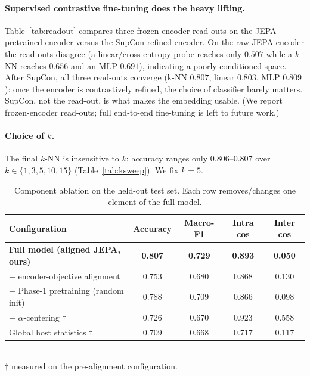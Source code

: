 \documentclass{article}
\begin{document}
\paragraph{Supervised contrastive fine-tuning does the heavy lifting.} Table~\ref{tab:readout} compares three frozen-encoder read-outs on the JEPA-pretrained encoder versus the SupCon-refined encoder. On the raw JEPA encoder the read-outs disagree (a linear/cross-entropy probe reaches only $0.507$ while a $k$-NN reaches $0.656$ and an MLP $0.691$), indicating a poorly conditioned space. After SupCon, all three read-outs converge (k-NN $0.807$, linear $0.803$, MLP $0.809$): once the encoder is contrastively refined, the choice of classifier barely matters. SupCon, not the read-out, is what makes the embedding usable. (We report frozen-encoder read-outs; full end-to-end fine-tuning is left to future work.)

\paragraph{Choice of $k$.} The final $k$-NN is insensitive to $k$: accuracy ranges only $0.806$--$0.807$ over $k \in \{1,3,5,10,15\}$ (Table~\ref{tab:ksweep}). We fix $k=5$.

\begin{table}[h]
  \caption{Component ablation on the held-out test set. Each row removes/changes one element of the full model.}
  \label{tab:ablation}
  \centering
  \begin{tabular}{lcccc}
    \toprule
    Configuration & Accuracy & Macro-F1 & Intra cos & Inter cos \\
    \midrule
    \textbf{Full model (aligned JEPA, ours)}   & \textbf{0.807} & \textbf{0.729} & \textbf{0.893} & \textbf{0.050} \\
    $-$ encoder-objective alignment            & 0.753 & 0.680 & 0.868 & 0.130 \\
    $-$ Phase-1 pretraining (random init)      & 0.788 & 0.709 & 0.866 & 0.098 \\
    $-$ $\alpha$-centering $\dagger$           & 0.726 & 0.670 & 0.923 & 0.558 \\
    Global host statistics $\dagger$           & 0.709 & 0.668 & 0.717 & 0.117 \\
    \bottomrule
  \end{tabular}\\[2pt]
  {\footnotesize $\dagger$ measured on the pre-alignment configuration.}
\end{table}
\end{document}

